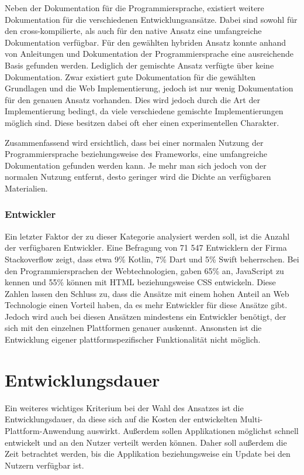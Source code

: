 Neben der Dokumentation für die Programmiersprache, existiert weitere Dokumentation für die verschiedenen Entwicklungsansätze. Dabei sind sowohl für den cross-kompilierte, als auch für den native Ansatz eine umfangreiche Dokumentation verfügbar. Für den gewählten hybriden Ansatz konnte anhand von Anleitungen und Dokumentation der Programmiersprache eine ausreichende Basis gefunden werden. Lediglich der gemischte Ansatz verfügte über keine Dokumentation. Zwar existiert gute Dokumentation für die gewählten Grundlagen und die Web Implementierung, jedoch ist nur wenig Dokumentation für den genauen Ansatz vorhanden. Dies wird jedoch durch die Art der Implementierung bedingt, da viele verschiedene gemischte Implementierungen möglich sind. Diese besitzen dabei oft eher einen experimentellen Charakter.

Zusammenfassend wird ersichtlich, dass bei einer normalen Nutzung der Programmiersprache beziehungsweise des Frameworks, eine umfangreiche Dokumentation gefunden werden kann. Je mehr man sich jedoch von der normalen Nutzung entfernt, desto geringer wird die Dichte an verfügbaren Materialien. 

\subsubsection{Entwickler}
Ein letzter Faktor der zu dieser Kategorie analysiert werden soll, ist die Anzahl der verfügbaren Entwickler. Eine Befragung \cite{statist_used_programming_languages} von 71 547 Entwicklern der Firma Stackoverflow zeigt, dass etwa 9\% Kotlin, 7\% Dart und 5\% Swift beherrschen.
Bei den Programmiersprachen der Webtechnologien, gaben  65\% an, JavaScript zu kennen und 55\% können mit HTML beziehungsweise CSS entwickeln. Diese Zahlen lassen den Schluss zu, dass die Ansätze mit einem hohen Anteil an Web Technologie einen Vorteil haben, da es mehr Entwickler für diese Ansätze gibt. Jedoch wird auch bei diesen Ansätzen mindestens ein Entwickler benötigt, der sich mit den einzelnen Plattformen genauer auskennt. 
Ansonsten ist die Entwicklung eigener plattformspezifischer Funktionalität nicht möglich.

\section{Entwicklungsdauer}
Ein weiteres wichtiges Kriterium bei der Wahl des Ansatzes ist die Entwicklungsdauer, da diese sich auf die Kosten der entwickelten Multi-Plattform-Anwendung auswirkt. Außerdem sollen Applikationen möglichst schnell entwickelt und an den Nutzer verteilt werden können. Daher soll außerdem die Zeit betrachtet werden, bis die Applikation beziehungsweise ein Update bei den Nutzern verfügbar ist.

